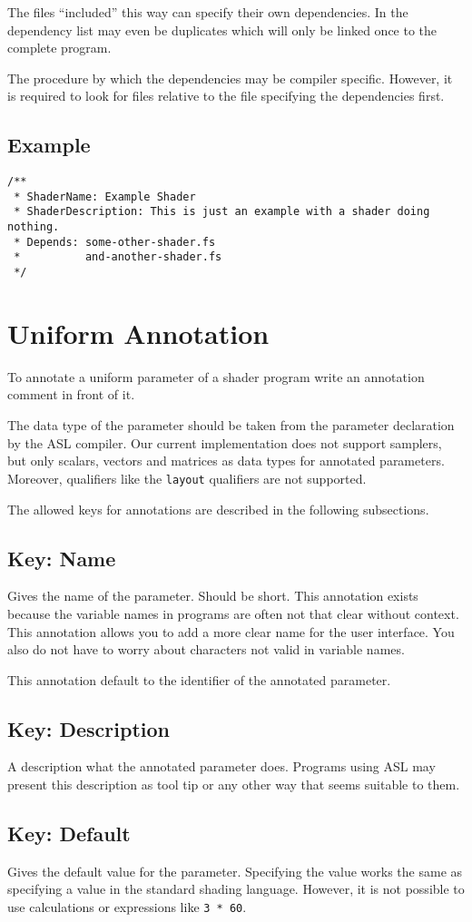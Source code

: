 \documentclass[11pt,a4paper]{scrreprt}
\newcommand{\key}[1]{\subsection{Key: #1}}
\begin{document}
The files ``included'' this way can specify their own dependencies. In the 
dependency list may even be duplicates which will only be linked once to the 
complete program.

The procedure by which the dependencies may be compiler specific. However, it is
required to look for files relative to the file specifying the dependencies 
first.

\subsection{Example}
\begin{lstlisting}
/**
 * ShaderName: Example Shader
 * ShaderDescription: This is just an example with a shader doing nothing.
 * Depends: some-other-shader.fs
 *          and-another-shader.fs
 */
\end{lstlisting}

\section{Uniform Annotation}
To annotate a uniform parameter of a shader program write an annotation comment 
in front of it.

The data type of the parameter should be taken from the parameter declaration by 
the ASL compiler. Our current implementation does not support samplers, but only 
scalars, vectors and matrices as data types for annotated parameters. Moreover, 
qualifiers like the \lstinline$layout$ qualifiers are not supported.

The allowed keys for annotations are described in the following subsections.

\key{Name}
Gives the name of the parameter. Should be short. This annotation exists because 
the variable names in programs are often not that clear without context. This 
annotation allows you to add a more clear name for the user interface. You also 
do not have to worry about characters not valid in variable names.

This annotation default to the identifier of the annotated parameter.

\key{Description}
A description what the annotated parameter does. Programs using ASL may present 
this description as tool tip or any other way that seems suitable to them.

\key{Default}
Gives the default value for the parameter. Specifying the value works the same 
as specifying a value in the standard shading language. However, it is not 
possible to use calculations or expressions like \lstinline$3 * 60$.
\end{document}
